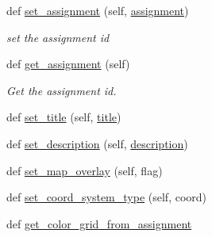\begin{DoxyCompactItemize}
def \hyperlink{class_bridges_1_1bridges_1_1_bridges_a7a8e13b7b0908c9d0bce26c5ad41c32e}{set\+\_\+assignment} (self, \hyperlink{class_bridges_1_1bridges_1_1_bridges_a2532355e121918d9c30c4fb19161e92e}{assignment})
\begin{DoxyCompactList}\small\item\em set the assignment id \end{DoxyCompactList}\item 
def \hyperlink{class_bridges_1_1bridges_1_1_bridges_ac65a74c86b8b2e456f43cf731daae085}{get\+\_\+assignment} (self)
\begin{DoxyCompactList}\small\item\em Get the assignment id. \end{DoxyCompactList}\item 
def \hyperlink{class_bridges_1_1bridges_1_1_bridges_a1732ccf3904c3de48f697feff32b95a5}{set\+\_\+title} (self, \hyperlink{class_bridges_1_1bridges_1_1_bridges_adfe0d9b713e54711c8a682054ba763c3}{title})
\item 
def \hyperlink{class_bridges_1_1bridges_1_1_bridges_aa9af47e59998f5d9659c4d49295c6ece}{set\+\_\+description} (self, \hyperlink{class_bridges_1_1bridges_1_1_bridges_abbc20a6c63c12ce54ef567380139d2c4}{description})
\item 
def \hyperlink{class_bridges_1_1bridges_1_1_bridges_ae051d3b37125d0806f15a0990df5885c}{set\+\_\+map\+\_\+overlay} (self, flag)
\item 
def \hyperlink{class_bridges_1_1bridges_1_1_bridges_a6e70886184cb4735961507d9e84eb8fe}{set\+\_\+coord\+\_\+system\+\_\+type} (self, coord)
\item 
def \hyperlink{class_bridges_1_1bridges_1_1_bridges_a88c1a0909a08065f31c5d0868e9d1900}{get\+\_\+color\+\_\+grid\+\_\+from\+\_\+assignment}
\end{DoxyCompactItemize}
